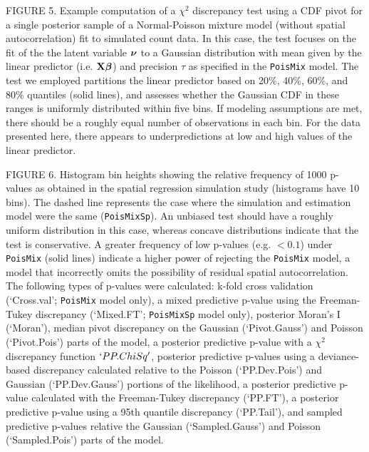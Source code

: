 \documentclass[12pt,english]{article}
\begin{document}
\begin{spacing}{1.9}
FIGURE 5.  Example computation of a $\chi^2$ discrepancy test using a CDF pivot for a single posterior sample of a Normal-Poisson mixture model (without spatial autocorrelation) fit to simulated count data.  In this case, the test focuses on the fit of the the latent variable $\boldsymbol{\nu}$ to a Gaussian distribution with mean given by the linear predictor (i.e. ${\bf X}\boldsymbol{\beta}$) and precision $\tau$ as specified in the \texttt{PoisMix} model. The test we employed partitions the linear predictor based on 20\%, 40\%, 60\%, and 80\% quantiles (solid lines), and assesses whether the Gaussian CDF in these ranges is uniformly distributed within five bins.  If modeling assumptions are met, there should be a roughly equal number of observations in each bin.  For the data presented here, there appears to underpredictions at low and high values of the linear predictor.

FIGURE 6.  Histogram bin heights showing the relative frequency of 1000 p-values as obtained in the spatial regression simulation study (histograms have 10 bins).  The dashed line represents the case where the simulation and estimation model were the same (\texttt{PoisMixSp}).  An unbiased test should have a roughly uniform distribution in this case, whereas concave distributions indicate that the test is conservative.  A greater frequency of low p-values (e.g. $<0.1$) under \texttt{PoisMix} (solid lines) indicate a higher power of rejecting the \texttt{PoisMix} model, a model that incorrectly omits the possibility of residual spatial autocorrelation.  The following types of p-values were calculated: k-fold cross validation (`Cross.val'; \texttt{PoisMix} model only), a mixed predictive p-value using the Freeman-Tukey discrepancy (`Mixed.FT'; \texttt{PoisMixSp} model only), posterior Moran's I (`Moran'), median pivot discrepancy on the Gaussian (`Pivot.Gauss') and Poisson (`Pivot.Pois') parts of the model, a posterior predictive p-value with a $\chi^2$ discrepancy function $`PP.ChiSq'$, posterior predictive p-values using a deviance-based discrepancy calculated relative to the Poisson (`PP.Dev.Pois') and Gaussian (`PP.Dev.Gauss') portions of the likelihood, a posterior predictive p-value calculated with the Freeman-Tukey discrepancy (`PP.FT'), a posterior predictive p-value using a 95th quantile discrepancy (`PP.Tail'), and sampled predictive p-values relative the Gaussian (`Sampled.Gauss') and Poisson (`Sampled.Pois') parts of the model.


\pagebreak


\end{spacing}
\end{document}
